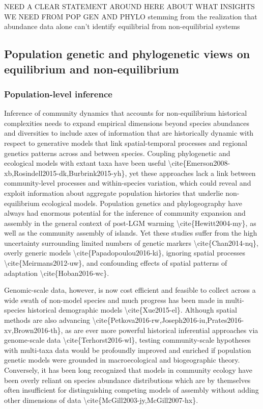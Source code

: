 \documentclass[]{article}
\begin{document}
NEED A CLEAR STATEMENT AROUND HERE ABOUT WHAT INSIGHTS WE NEED FROM POP
GEN AND PHYLO stemming from the realization that abundance data alone
can't identify equilibrial from non-equilibrial systems

\subsection{Population genetic and phylogenetic views on equilibrium and
non-equilibrium}\label{population-genetic-and-phylogenetic-views-on-equilibrium-and-non-equilibrium}

\subsubsection{Population-level
inference}\label{population-level-inference}

Inference of community dynamics that accounts for non-equilibrium
historical complexities needs to expand empirical dimensions beyond
species abundances and diversities to include axes of information that
are historically dynamic with respect to generative models that link
spatial-temporal processes and regional genetics patterns across and
between species. Coupling phylogenetic and ecological models with extant
taxa have been useful
\textbackslash{}cite\{Emerson2008-xb,Rosindell2015-dk,Burbrink2015-yh\},
yet these approaches lack a link between community-level processes and
within-species variation, which could reveal and exploit information
about aggregate population histories that underlie non-equilibrium
ecological models. Population genetics and phylogeography have always
had enormous potential for the inference of community expansion and
assembly in the general context of post-LGM warming
\textbackslash{}cite\{Hewitt2004-my\}, as well as the community assembly
of islands. Yet these studies suffer from the high uncertainty
surrounding limited numbers of genetic markers
\textbackslash{}cite\{Chan2014-nq\}, overly generic models
\textbackslash{}cite\{Papadopoulou2016-ki\}, ignoring spatial processes
\textbackslash{}cite\{Meirmans2012-uw\}, and confounding effects of
spatial patterns of adaptation \textbackslash{}cite\{Hoban2016-wc\}.

Genomic-scale data, however, is now cost efficient and feasible to
collect across a wide swath of non-model species and much progress has
been made in multi-species historical demographic models
\textbackslash{}cite\{Xue2015-el\}. Although spatial methods are also
advancing
\textbackslash{}cite\{Petkova2016-rw,Joseph2016-iu,Prates2016-xv,Brown2016-th\},
as are ever more powerful historical inferential approaches via
genome-scale data \textbackslash{}cite\{Terhorst2016-wl\}, testing
community-scale hypotheses with multi-taxa data would be profoundly
improved and enriched if population genetic models were grounded in
macroecological and biogeographic theory. Conversely, it has been long
recognized that models in community ecology have been overly reliant on
species abundance distributions which are by themselves often
insufficient for distinguishing competing models of assembly without
adding other dimensions of data
\textbackslash{}cite\{McGill2003-jy,McGill2007-hx\}.
\end{document}
